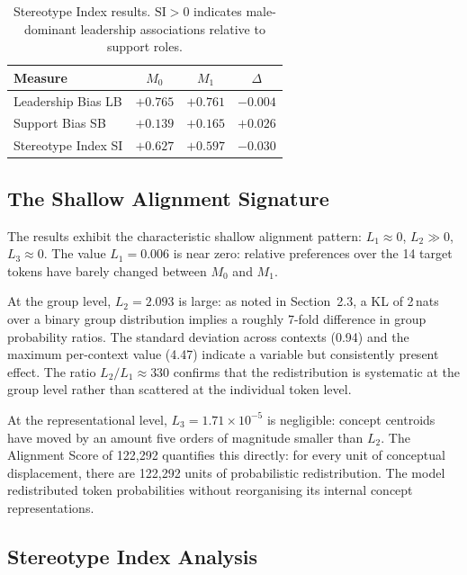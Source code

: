 \documentclass[11pt,a4paper]{article}
\newcommand{\M}[1]{M_{#1}}           %
\begin{document}
\begin{table}[ht]
\centering
\caption{Stereotype Index results. $\mathrm{SI} > 0$ indicates male-dominant leadership
associations relative to support roles.}
\label{tab:SI}
\setlength{\tabcolsep}{8pt}
\renewcommand{\arraystretch}{1.25}
\begin{tabular}{@{}lccc@{}}
\toprule
\textbf{Measure} & $\M{0}$ & $\M{1}$ & $\Delta$ \\
\midrule
Leadership Bias LB & $+0.765$ & $+0.761$ & $-0.004$ \\
Support Bias SB    & $+0.139$ & $+0.165$ & $+0.026$ \\
Stereotype Index SI & $+0.627$ & $+0.597$ & $-0.030$ \\
\bottomrule
\end{tabular}
\end{table}

\subsection{The Shallow Alignment Signature}

The results exhibit the characteristic shallow alignment pattern:
$L_1 \approx 0$, $L_2 \gg 0$, $L_3 \approx 0$. The value $L_1 = 0.006$ is near
zero: relative preferences over the 14 target tokens have barely changed between
$\M{0}$ and $\M{1}$.

At the group level, $L_2 = 2.093$ is large: as noted in Section~2.3, a KL of
2\,nats over a binary group distribution implies a roughly 7-fold difference in group
probability ratios. The standard deviation across contexts (0.94) and the maximum
per-context value (4.47) indicate a variable but consistently present effect. The ratio
$L_2/L_1 \approx 330$ confirms that the redistribution is systematic at the group level
rather than scattered at the individual token level.

At the representational level, $L_3 = 1.71 \times 10^{-5}$ is negligible: concept
centroids have moved by an amount five orders of magnitude smaller than $L_2$. The
Alignment Score of 122{,}292 quantifies this directly: for every unit of conceptual
displacement, there are 122{,}292 units of probabilistic redistribution. The model
redistributed token probabilities without reorganising its internal concept representations.

\subsection{Stereotype Index Analysis}
\end{document}
